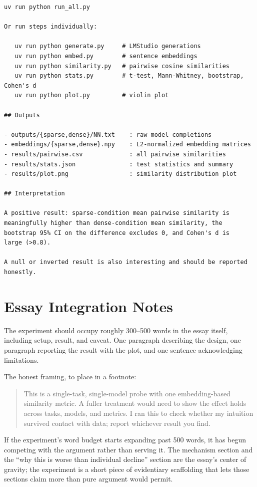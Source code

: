 \documentclass[11pt]{article}
\begin{document}
\begin{lstlisting}[style=yamlstyle,language={}]
   uv run python run_all.py

Or run steps individually:

   uv run python generate.py     # LMStudio generations
   uv run python embed.py        # sentence embeddings
   uv run python similarity.py   # pairwise cosine similarities
   uv run python stats.py        # t-test, Mann-Whitney, bootstrap, Cohen's d
   uv run python plot.py         # violin plot

## Outputs

- outputs/{sparse,dense}/NN.txt    : raw model completions
- embeddings/{sparse,dense}.npy    : L2-normalized embedding matrices
- results/pairwise.csv             : all pairwise similarities
- results/stats.json               : test statistics and summary
- results/plot.png                 : similarity distribution plot

## Interpretation

A positive result: sparse-condition mean pairwise similarity is
meaningfully higher than dense-condition mean similarity, the
bootstrap 95% CI on the difference excludes 0, and Cohen's d is
large (>0.8).

A null or inverted result is also interesting and should be reported
honestly.
\end{lstlisting}

\section{Essay Integration Notes}

The experiment should occupy roughly 300--500 words in the essay itself, including setup, result, and caveat. One paragraph describing the design, one paragraph reporting the result with the plot, and one sentence acknowledging limitations.

The honest framing, to place in a footnote:

\begin{quote}
\small This is a single-task, single-model probe with one embedding-based similarity metric. A fuller treatment would need to show the effect holds across tasks, models, and metrics. I ran this to check whether my intuition survived contact with data; report whichever result you find.
\end{quote}

If the experiment's word budget starts expanding past 500 words, it has begun competing with the argument rather than serving it. The mechanism section and the ``why this is worse than individual decline'' section are the essay's center of gravity; the experiment is a short piece of evidentiary scaffolding that lets those sections claim more than pure argument would permit.
\end{document}
